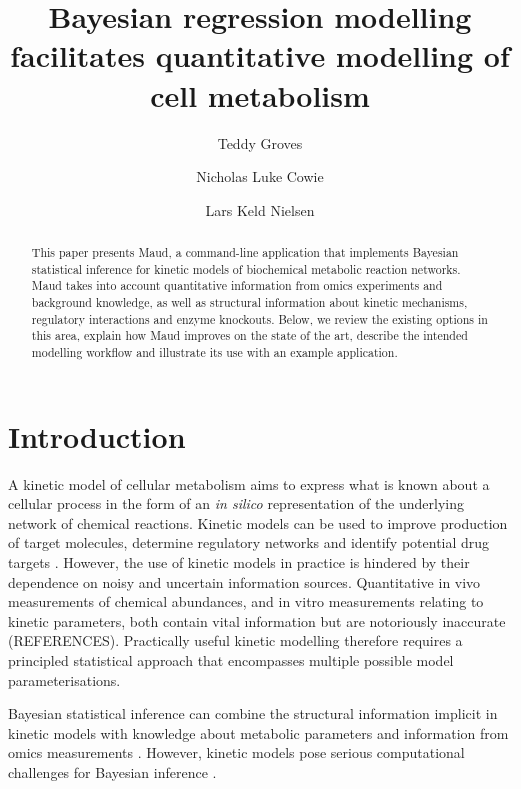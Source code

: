 \documentclass[journal=asbcd6,manuscript=article,layout=traditional]{achemso}
\author{Teddy Groves}
\affiliation{ DTU Biosustain,  }
\author{Nicholas Luke Cowie}
\affiliation{ DTU Biosustain,  }
\author{Lars Keld Nielsen}
\affiliation{ DTU Biosustain,  }
\title[]{Bayesian regression modelling facilitates quantitative
modelling of cell metabolism}
\begin{document}
\maketitle
\begin{abstract}
This paper presents Maud, a command-line application that implements
Bayesian statistical inference for kinetic models of biochemical
metabolic reaction networks. Maud takes into account quantitative
information from omics experiments and background knowledge, as well as
structural information about kinetic mechanisms, regulatory interactions
and enzyme knockouts. Below, we review the existing options in this
area, explain how Maud improves on the state of the art, describe the
intended modelling workflow and illustrate its use with an example
application.
\end{abstract}
\ifdefined\Shaded\renewenvironment{Shaded}{\begin{tcolorbox}[interior hidden, frame hidden, breakable, enhanced, borderline west={3pt}{0pt}{shadecolor}, sharp corners, boxrule=0pt]}{\end{tcolorbox}}\fi

\hypertarget{introduction}{%
\section{Introduction}\label{introduction}}

A kinetic model of cellular metabolism aims to express what is known
about a cellular process in the form of an \emph{in silico}
representation of the underlying network of chemical reactions. Kinetic
models can be used to improve production of target molecules, determine
regulatory networks \citep{christodoulou_reserve_2018} and identify
potential drug targets
\citep{deberardinis_fundamentals_2016, Liberti2017}. However, the use of
kinetic models in practice is hindered by their dependence on noisy and
uncertain information sources. Quantitative in vivo measurements of
chemical abundances, and in vitro measurements relating to kinetic
parameters, both contain vital information but are notoriously
inaccurate (REFERENCES). Practically useful kinetic modelling therefore
requires a principled statistical approach that encompasses multiple
possible model parameterisations.

Bayesian statistical inference can combine the structural information
implicit in kinetic models with knowledge about metabolic parameters and
information from omics measurements
\citep{saa_construction_2016, gopalakrishnan_k-fit_2020}. However,
kinetic models pose serious computational challenges for Bayesian
inference \citep{gutenkunst_2007, raue_identifiability_2010}.
\end{document}
